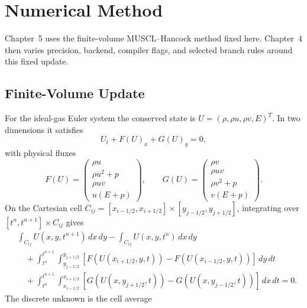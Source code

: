 
\chapter{Numerical Method}

Chapter~5 uses the finite-volume MUSCL--Hancock method fixed here.
Chapter~4 then varies precision, backend, compiler flags, and selected branch
rules around this fixed update.

\section{Finite-Volume Update}
For the ideal-gas Euler system the conserved state is
\(U=(\rho,\rho u,\rho v,E)^T\). In two dimensions it satisfies
\begin{equation}\label{eq:ch3-euler-2d}
  U_t + F(U)_x + G(U)_y = 0,
\end{equation}
with physical fluxes
\begin{equation}\label{eq:ch3-euler-fluxes}
  F(U)=
  \begin{pmatrix}
    \rho u\\ \rho u^2+p\\ \rho uv\\ u(E+p)
  \end{pmatrix},
  \qquad
  G(U)=
  \begin{pmatrix}
    \rho v\\ \rho uv\\ \rho v^2+p\\ v(E+p)
  \end{pmatrix}.
\end{equation}
On the Cartesian cell
\(C_{ij}=[x_{i-1/2},x_{i+1/2}]\times[y_{j-1/2},y_{j+1/2}]\), integrating over
\([t^n,t^{n+1}]\times C_{ij}\) gives
\begin{equation}\label{eq:ch3-fv-integral}
\begin{aligned}
  &\int_{C_{ij}} U(x,y,t^{n+1})\,dx\,dy
  - \int_{C_{ij}} U(x,y,t^n)\,dx\,dy \\
  &\quad
  + \int_{t^n}^{t^{n+1}}\!\!\int_{y_{j-1/2}}^{y_{j+1/2}}
      \left[F(U(x_{i+1/2},y,t))-F(U(x_{i-1/2},y,t))\right]\,dy\,dt \\
  &\quad
  + \int_{t^n}^{t^{n+1}}\!\!\int_{x_{i-1/2}}^{x_{i+1/2}}
      \left[G(U(x,y_{j+1/2},t))-G(U(x,y_{j-1/2},t))\right]\,dx\,dt
  =0 .
\end{aligned}
\end{equation}
The discrete unknown is the cell average
